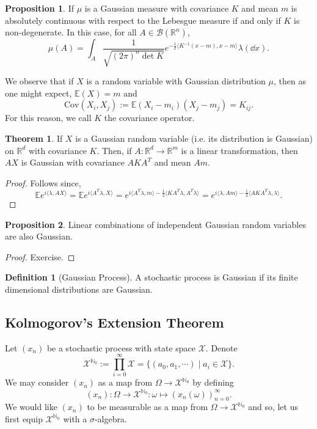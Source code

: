 \documentclass[]{article}
\theoremstyle{definition}
\newtheorem{theorem}{Theorem}
\theoremstyle{definition}
\newtheorem{definition}{Definition}[section]
\newtheorem{proposition}{Proposition}[section]
\begin{document}
\begin{proposition}
  If \(\mu\) is a Gaussian measure with covariance \(K\) and mean \(m\) 
  is absolutely continuous with respect to the Lebesgue measure if and only if 
  \(K\) is non-degenerate. In this case, for all \(A \in \mathcal{B}(\mathbb{R}^n)\),
  \[\mu(A) = \int_A \frac{1}{\sqrt{(2\pi)^n \det K}} 
    e^{-\frac{1}{2}\langle K^{-1}(x - m), x - m \rangle} \lambda(\dd x).\]
\end{proposition}

We observe that if \(X\) is a random variable with Gaussian distribution \(\mu\), 
then as one might expect, \(\mathbb{E}(X) = m\) and 
\[\text{Cov}(X_i, X_j) := \mathbb{E}(X_i - m_i)(X_j - m_j) = K_{ij}.\]
For this reason, we call \(K\) the covariance operator.

\begin{theorem}
  If \(X\) is a Gaussian random variable (i.e. its distribution is Gaussian) 
  on \(\mathbb{R}^d\) with covariance \(K\). Then, if \(A : \mathbb{R}^d \to \mathbb{R}^m\) 
  is a linear transformation, then \(AX\) is Gaussian with covariance \(AKA^T\) 
  and mean \(Am\).
\end{theorem}
\begin{proof}
  Follows since,
  \[\mathbb{E}e^{i \langle \lambda, AX \rangle} = \mathbb{E}e^{i \langle A^T\lambda, X\rangle}
    = e^{i \langle A^T \lambda, m \rangle - \frac{1}{2}\langle KA^T \lambda, A^T \lambda\rangle}
    = e^{i \langle \lambda, Am \rangle - \frac{1}{2}\langle AKA^T \lambda, \lambda\rangle}.\]
\end{proof}

\begin{proposition}
  Linear combinations of independent Gaussian random variables are also Gaussian.
\end{proposition}
\begin{proof}
  Exercise.
\end{proof}

\begin{definition}[Gaussian Process]
  A stochastic process is Gaussian if its finite dimensional distributions 
  are Gaussian.
\end{definition}

\subsection{Kolmogorov's Extension Theorem}

Let \((x_n)\) be a stochastic process with state space \(\mathcal{X}\). 
Denote 
\[\mathcal{X}^{\mathbb{N}_0} := \prod_{i = 0}^\infty \mathcal{X} = 
  \{(a_0, a_1, \cdots) \mid a_i \in \mathcal{X}\}.\]
We may consider \((x_n)\) as a map from \(\Omega \to \mathcal{X}^{\mathbb{N}_0}\) by 
defining 
\[(x_n) : \Omega \to \mathcal{X}^{\mathbb{N}_0} : \omega \mapsto (x_n(\omega))_{n = 0}^\infty.\]
We would like \((x_n)\) to be measurable as a map from \(\Omega \to \mathcal{X}^{\mathbb{N}_0}\) 
and so, let us first equip \(\mathcal{X}^{\mathbb{N}_0}\) with a \(\sigma\)-algebra.
\end{document}
